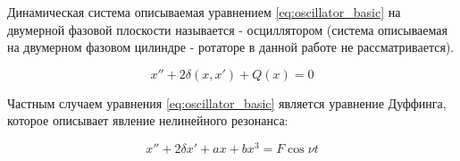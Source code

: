 Динамическая система описываемая уравнением \ref{eq:oscillator_basic} на двумерной фазовой плоскости называется - осциллятором (система
описываемая на двумерном фазовом цилиндре - ротаторе в данной работе не рассматривается)\cite{chaos_neimark_landa}.
\begin{center}
\begin{equation}
	\label{eq:oscillator_basic}
	x'' + 2\delta(x, x') + Q(x) = 0
\end{equation}
\end{center}

Частным случаем уравнения \ref{eq:oscillator_basic} является уравнение Дуффинга, которое описывает явление нелинейного резонанса:
\begin{center}
\begin{equation}
	\label{eq:oscillator_duffing}
	x'' + 2\delta{x'} + ax +bx^3 = F\cos{\nu{t}}
\end{equation}
\end{center}

\newpage
